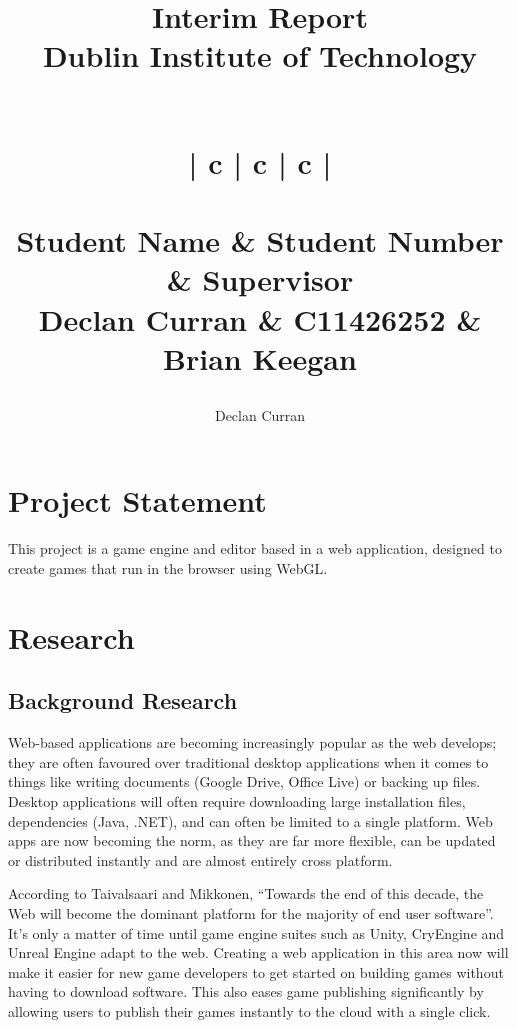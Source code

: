 \documentclass[a4paper, 12pt]{article}
\begin{document}
\title{
	{Interim Report}\\
	\large{Dublin Institute of Technology}\\
	~\\
	\begin{tabular}{| c | c | c |}
		\hline
		 \\
		\\ \hline
		\textbf{Student Name} & \textbf{Student Number} & \textbf{Supervisor} \\
		Declan Curran & C11426252 & Brian Keegan \\ \hline
	\end{tabular}
}
\author{Declan Curran}
\maketitle
\newpage

\setcounter{tocdepth}{3}
\tableofcontents
\listoffigures
\listoftables
\newpage

\section{Project Statement}
This project is a game engine and editor based in a web application, designed to create games that run in the browser using WebGL. 
\section{Research}
\subsection{Background Research}

Web-based applications are becoming increasingly popular as the web develops; they are often favoured over traditional desktop applications when it comes to things like writing documents (Google Drive, Office Live) or backing up files.\cite{6068340} Desktop applications will often require downloading large installation files, dependencies (Java, .NET), and can often be limited to a single platform. Web apps are now becoming the norm, as they are far more flexible, can be updated or distributed instantly and are almost entirely cross platform.\cite{5936687}

According to Taivalsaari and Mikkonen, ``Towards the end of this decade, the Web will become the dominant platform for the majority of 
end user software''.\cite{6068340} It's only a matter of time until game engine suites such as Unity\cite{unity}, CryEngine\cite{cryengine} and Unreal Engine\cite{unreal} adapt to the web. Creating a web application in this area now will make it easier for new game developers to get started on building games without having to download software. This also eases game publishing significantly by allowing users to publish their games instantly to the cloud with a single click.
\end{document}
